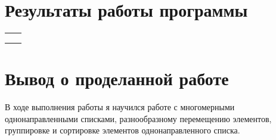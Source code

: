 \documentclass[12pt,a4paper]{extarticle}
\begin{document}
\begin{center}
\end{center}

\section{Результаты работы программы}
\begin{tabularx}{\textwidth}{|>{\ttfamily\footnotesize}X|>{\ttfamily\footnotesize}X|}
    \hline
    \multicolumn{2}{|X|}{Ввод} \\ \hline
    \multicolumn{2}{|X|}{\par} \\ \hline
    \multicolumn{2}{|X|}{Вывод} \\ \hline
    \multicolumn{2}{|X|}{} \\ \hline
\end{tabularx}

\section{Вывод о проделанной работе}
В ходе выполнения работы я научился работе с многомерными однонаправленными списками, разнообразному
перемещению элементов, группировке и сортировке элементов однонаправленного списка.
\end{document}
